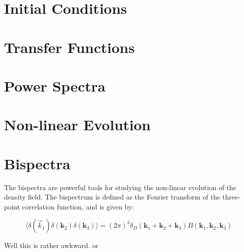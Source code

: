 %
%

\section{Initial Conditions}

\section{Transfer Functions}

\section{Power Spectra}

\section{Non-linear Evolution} 

\section{Bispectra}

The bispectra are powerful tools for studying the non-linear evolution of the density field. The bispectrum is defined as the Fourier transform of the three-point correlation function, and is given by:

\begin{equation}
    \langle \delta(\vec{k}_1) \delta(\mathbf{k}_2) \delta(\mathbf{k}_3) \rangle = (2\pi)^3 \delta_D(\mathbf{k}_1 + \mathbf{k}_2 + \mathbf{k}_3) B(\mathbf{k}_1, \mathbf{k}_2, \mathbf{k}_3)
\end{equation}

Well this is rather awkward. \cite{adamek_gevolution_2016} or \autocite{falck_effect_2017}
